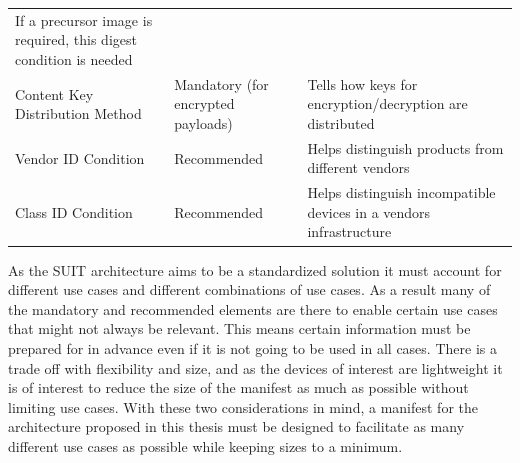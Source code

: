 \documentclass[0-thesis.tex]{subfiles}
\begin{document}
\begin{small}
\begin{longtable}[]{@{}lll@{}}
\begin{minipage}[t]{0.42\columnwidth}
    If a precursor image is required, this digest condition is needed\strut
    \end{minipage}\tabularnewline
    \begin{minipage}[t]{0.23\columnwidth}\raggedright\strut
    Content Key Distribution Method\strut
    \end{minipage} & \begin{minipage}[t]{0.26\columnwidth}\raggedright\strut
    Mandatory (for encrypted payloads)\strut
    \end{minipage} & \begin{minipage}[t]{0.42\columnwidth}\raggedright\strut
    Tells how keys for encryption/decryption are distributed\strut
    \end{minipage}\tabularnewline
    \begin{minipage}[t]{0.23\columnwidth}\raggedright\strut
    Vendor ID Condition\strut
    \end{minipage} & \begin{minipage}[t]{0.26\columnwidth}\raggedright\strut
    Recommended\strut
    \end{minipage} & \begin{minipage}[t]{0.42\columnwidth}\raggedright\strut
    Helps distinguish products from different vendors\strut
    \end{minipage}\tabularnewline
    \begin{minipage}[t]{0.23\columnwidth}\raggedright\strut
    Class ID Condition\strut
    \end{minipage} & \begin{minipage}[t]{0.26\columnwidth}\raggedright\strut
    Recommended\strut
    \end{minipage} & \begin{minipage}[t]{0.42\columnwidth}\raggedright\strut
    Helps distinguish incompatible devices in a vendors infrastructure\strut
    \end{minipage}\tabularnewline
    \bottomrule
\end{longtable}
\end{small}

As the SUIT architecture aims to be a standardized solution it must account for different
use cases and different combinations of use cases. As a result many of the mandatory and
recommended elements are there to enable certain use cases that might not always be
relevant. This means certain information must be prepared for in advance even if it is not
going to be used in all cases. There is a trade off with flexibility and size, and as the
devices of interest are lightweight it is of interest to reduce the size of the manifest
as much as possible without limiting use cases. With these two considerations in mind, a
manifest for the architecture proposed in this thesis must be designed to facilitate as
many different use cases as possible while keeping sizes to a minimum.
\end{document}
